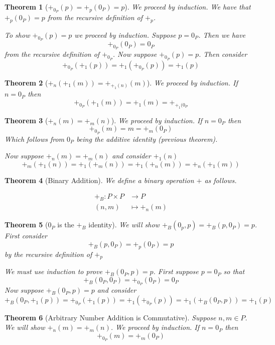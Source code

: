 \documentclass[12pt]{article}
\theoremstyle{break}
\theoremstyle{break}
\newtheorem{theorem}{Theorem}[section]
\theoremstyle{break}
\theoremstyle{break}
\theoremstyle{break}
\newtheorem{informal definition}[definition]{Informal Definition}
\begin{document}
\begin{theorem}[$+_{0_P}(p) = +_p(0_P) = p$]
We proceed by induction.
We have that $+_p(0_P) = p$ from the recursive definition of $+_p$.

To show $+_{0_P}(p)=p$ we proceed by induction.
Suppose $p=0_P$.
Then we have
$$
+_{0_P}(0_P) = 0_P
$$
from the recursive definition of $+_{0_P}$.
Now suppose $+_{0_P}(p) = p$.
Then consider
$$
+_{0_P}(+_1(p)) = +_1(+_{0_P}(p)) = +_1(p)
$$
\end{theorem}

\begin{theorem}[$+_n(+_1(m)) = +_{+_1(n)}(m)$]
We proceed by induction.
If $n=0_P$ then
$$
+_{0_P}(+_1(m)) = +_1(m) = +_{+_1(0_P}
$$
\end{theorem}

\begin{theorem}[$+_n(m) = +_m(n)$]
We proceed by induction.
If $n=0_P$ then
$$
+_{0_P}(m) = m = +_m(0_P)
$$
Which follows from $0_P$ being the additive identity (previous theorem).

Now suppose $+_n(m) = +_m(n)$ and consider $+_1(n)$
$$
+_m(+_1(n)) = +_1(+_m(n)) = +_1(+_n(m)) = +_n(+_1(m))
$$

\end{theorem}


\begin{theorem}[Binary Addition]
We define a binary operation $+$ as follows.

\begin{align*}
+_B: P \times P &\to P\\
(n, m) &\mapsto +_n(m)
\end{align*}
\end{theorem}

\begin{theorem}[$0_P$ is the $+_B$ identity]
We will show $+_B(0_p, p) = +_B(p, 0_P) = p$.
First consider
$$
+_B(p, 0_P) = +_p(0_P) = p
$$
by the recursive definition of $+_p$

We must use induction to prove $+_B(0_P, p) = p$.
First suppose $p=0_P$ so that
$$
+_B(0_P, 0_P) = +_{0_P}(0_P) = 0_P
$$
Now suppose $+_B(0_P, p) = p$ and consider
$$
+_B(0_P, +_1(p)) = +_{0_P}(+_1(p)) = +_1(+_{0_P}(p)) = +_1(+_B(0_P, p)) = +_1(p)
$$
\end{theorem}


\begin{theorem}[Arbitrary Number Addition is Commutative]
Suppose $n, m \in P$.
We will show $+_n(m) = +_m(n)$.
We proceed by induction.
If $n=0_P$ then
$$
+_{0_P}(m) = +_m(0_P)
$$
\end{theorem}
\end{document}
